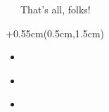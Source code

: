 \documentclass[xetex,18pt,aspectratio=169]{beamer}
\begin{document}
\begin{Large}
\begin{frame}{\ \ \ That's all, folks!}
\begin{textblock*}{\framewidth+0.55cm}(0.5cm,1.5cm)
\begin{itemize}
  \item \href{mailto:alexclear@gmail.com}{\color{blue}{alexclear@gmail.com}}
  \item \href{https://telegram.me/lhommequipleure}{\color{blue}{https://telegram.me/lhommequipleure}}
  \item \href{https://telegram.me/demeliorator\_pod}{\color{blue}{https://telegram.me/demeliorator\_pod}}
\end{itemize}
\end{textblock*}
\end{frame}

\end{Large}
\end{document}

